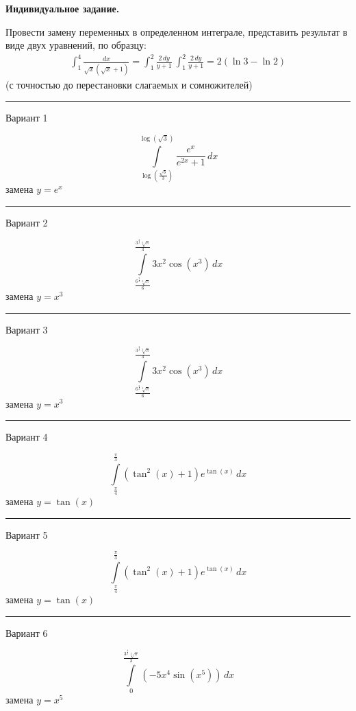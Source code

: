 \documentclass[11pt]{report}
\begin{document}
\pagestyle{empty}

{\bf Индивидуальное задание.}

 
Провести замену переменных в определенном интеграле, представить результат в виде двух уравнений, по образцу:
\begin{align*}
\int_1^4 \frac{dx}{\sqrt{x}\left(\sqrt{x}+1\right)} = \int_1^2 \frac{2\,dy}{y + 1}\
\int_1^2 \frac{2\,dy}{y + 1} = 2(\ln 3 - \ln 2)
\end{align*}
(с точностью до перестановки слагаемых и сомножителей)



\rule{\textwidth}{.2mm}

Вариант 1

$$\int\limits_{\log{\left(\frac{\sqrt{3}}{3} \right)}}^{\log{\left(\sqrt{3} \right)}} \frac{e^{x}}{e^{2 x} + 1}\, dx$$
замена $y = e^{x}$



\rule{\textwidth}{.2mm}

Вариант 2

$$\int\limits_{\frac{6^{\frac{2}{3}} \sqrt[3]{\pi}}{6}}^{\frac{3^{\frac{2}{3}} \sqrt[3]{\pi}}{3}} 3 x^{2} \cos{\left(x^{3} \right)}\, dx$$
замена $y = x^{3}$



\rule{\textwidth}{.2mm}

Вариант 3

$$\int\limits_{\frac{6^{\frac{2}{3}} \sqrt[3]{\pi}}{6}}^{\frac{3^{\frac{2}{3}} \sqrt[3]{\pi}}{3}} 3 x^{2} \cos{\left(x^{3} \right)}\, dx$$
замена $y = x^{3}$



\rule{\textwidth}{.2mm}

Вариант 4

$$\int\limits_{\frac{\pi}{4}}^{\frac{\pi}{3}} \left(\tan^{2}{\left(x \right)} + 1\right) e^{\tan{\left(x \right)}}\, dx$$
замена $y = \tan{\left(x \right)}$



\rule{\textwidth}{.2mm}

Вариант 5

$$\int\limits_{\frac{\pi}{4}}^{\frac{\pi}{3}} \left(\tan^{2}{\left(x \right)} + 1\right) e^{\tan{\left(x \right)}}\, dx$$
замена $y = \tan{\left(x \right)}$



\rule{\textwidth}{.2mm}

Вариант 6

$$\int\limits_{0}^{\frac{3^{\frac{4}{5}} \sqrt[5]{\pi}}{3}} \left(- 5 x^{4} \sin{\left(x^{5} \right)}\right)\, dx$$
замена $y = x^{5}$
\end{document}
